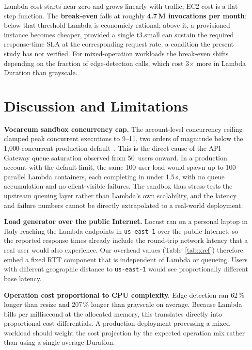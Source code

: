 \documentclass[10pt,twocolumn]{article}
\begin{document}
Lambda cost starts near zero and grows linearly with traffic; EC2 cost is a
flat step function. The \textbf{break-even} falls at roughly
\textbf{4.7\,M invocations per month}: below that threshold Lambda is
economicly rational; above it, a provisioned instance becomes cheaper, provided
a single t3.small can sustain the required response-time SLA at the
corresponding request rate, a condition the present study has not verified. For
mixed-operation workloads the break-even shifts depending on the fraction of
edge-detection calls, which cost 3$\times$ more in Lambda Duration than
grayscale.

\section{Discussion and Limitations}
\label{sec:discussion}

\textbf{Vocareum sandbox concurrency cap.}
The account-level concurrency ceiling clamped peak concurrent executions to
9--11, two orders of magnitude below the 1{,}000-concurrent production
default~\cite{aws:concurrency}. This is the direct cause of the API Gateway
queue saturation observed from 50~users onward. In a production account with
the default limit, the same 100-user load would spawn up to 100 parallel Lambda
containers, each completing in under 1.5\,s, with no queue accumulation and no
client-visible failures. The sandbox thus stress-tests the upstream queuing
layer rather than Lambda's own scalability, and the latency and failure numbers
cannot be directly extrapolated to a real-world deployment.

\textbf{Load generator over the public Internet.}
Locust ran on a personal laptop in Italy reaching the Lambda endpoints in
\texttt{us-east-1} over the public Internet, so the reported response times
already include the round-trip network latency that a real user would also
experience. Our overhead values (Table~\ref{tab:xref}) therefore embed a
fixed RTT component that is independent of Lambda or queueing. Users with
different geographic distance to \texttt{us-east-1} would see proportionally
different base latency.

\textbf{Operation cost proportional to CPU complexity.}
Edge detection ran 62\,\% longer than resize and 207\,\% longer than grayscale
on average. Because Lambda bills per millisecond at the allocated memory, this
translates directly into proportional cost differentials. A production deployment
processing a mixed workload should weight the cost projection by the expected
operation mix rather than using a single average Duration.
\end{document}
